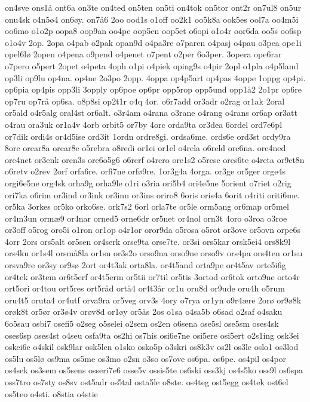 {on4sve
ons1å
ont6a
on3te
on4ted
on5ten
on5ti
on4tok
on5tor
ont2r
on7ul8
on5ur
onu4sk
o4n5ø4
on6øy.
on7å6
2oo
ood1s
o1off
oo2k1
oo5k8a
ook5es
ool7a
oo4m5i
oo6mo
o1o2p
oopa8
oop9an
oo4pe
oop5en
oop5et
o6opi
o1o4r
oor6da
oo5s
oo6sp
o1o4v
2op.
2opa
o4pab
o2pak
opan9d
o4pa3re
o7paren
o4pasj
o4pau
o3pea
ope1i
opel6lø
2open
o4pena
o9pend
o4penet
o7pent
o2per
6o3per.
3opera
ope6rar
o7pero
o5pert
2opet
o4peta
4oph
o1pi
o4piek
oping9s
o4pir
2opl
o1pla
o4p5land
op3li
op9lu
op4na.
op4ne
2o3po
2opp.
4oppa
op4p5art
op4pas
4oppe
1oppg
op4pi.
op6pia
op4pis
opp3li
3opply
op6poe
op6pr
opp5rop
opp5und
opp1å2
2o1pr
op6re
op7ru
op7rå
op6sa.
o8p8si
op2t1r
o4q
4or.
o6r7add
or3adr
o2rag
or1ak
2oral
or5ald
o4r5alg
oral4st
or6alt.
o3r4am
o4rana
o3rane
o4rang
o4rans
or6ap
or3att
o4rau
ora3uk
or1a4v
4orb
orbit5
or7by
4orc
orda9ta
or3dea
6ordel
ord7e6pl
or7dik
ordi4s
or4d5ise
ord3it
1ordn
ordre8gi.
ordsa6me.
ords6e
ord3st
ordy9ra
8ore
orear8a
orear8e
o5rebra
o8redi
or1ei
or1el
o4rela
o6reld
ore6na.
ore4ned
ore4net
or3enk
oren3s
ore6o5g6
o6rerf
o4rero
ore1s2
o5resc
ores6te
o4reta
or9et8n
o6retv
o2rev
2orf
orfa6re.
orfi7ne
orfø9re.
1or3g4a
4orga.
or3ge
or5ger
orge4s
orgi6e5ne
org4sk
orha9g
orha9le
o1ri
o3ria
ori5b4
ori4e5ne
5orient
o7riet
o2rig
ori7ka
o6rim
or3ind
or3ink
or3inn
or3ins
oriro8
6oris
oris4a
6orit
o4riti
oriti6me.
or5ka
3orkes
or5ko
orko6se.
ork7s2
6orl
orla7te
or5le
orm5ang
or6map
or5mel
or4m3un
ormæ9
or4nar
orned5
orne6dr
or5net
or4nol
orn3t
4oro
o3roa
o3roe
or3off
o5rog
oro5i
o1ron
or1op
o4r1or
oror9da
o5rosa
o5rot
or3ove
or5ovn
orpe6s
4orr
2ors
ors5alt
or5sen
or4serk
orse9ta
orse7te.
or3si
ors5kar
orsk5ei4
ors8k9l
ors4ku
or1s4l
orsmå8la
or1sn
or3s2o
orso9na
orso9ne
orso9v
ors4pa
ors4ten
or1su
orsva9re
or3sy
or9sø
2ort
or4t3ak
orta8la.
or4t5and
orta9pe
or4t5av
orte5i6g
or4tek
or3tem
or6t5erf
or4t5erm
or5tii
or7til
or5tis
3ortod
or6tok
orto9ne
orto4r
ort5ori
or4tou
ort5res
ort5råd
ortå4
or4t3år
or1u
oru8d
or9ude
oru4h
o5rum
oru4t5
oruta4
or4utf
orva9ra
or5veg
orv3s
4ory
o7rya
or1yn
o9r4ære
2orø
or9ø8k
orøk8t
or5ør
or3ø4v
orøv8d
or1øy
or5ås
2os
o1sa
o4sa5b
o6sad
o2saf
o4saku
6o5sau
osbi7
osefi5
o2seg
o5selei
o2sem
os2en
o6sena
ose5sl
ose5sm
oses4sk
oses6sp
oses4st
o4seu
osfa9ta
os2hi
os7his
osi6e7ne
osi5ere
osi5ert
o2s1ing
osk3ei
oskei6e
o4skil
osk9lar
osk5len
o1sko
osko5p
o3skri
os8k3v
os2l
os3le
oslo1
os3lod
os5lu
os5lø
os9ma
os5me
os3mo
o2sn
o3so
os7ove
os6pa.
os6pe.
os4pil
os4por
os4sek
os3sem
os5sens
osseri7e6
osse5v
ossis5te
os6ski
oss3kj
os4s5ko
oss9l
os6spa
oss7tro
os7sty
os8sv
ost5adr
os5tal
osta5le
o8ste.
os4teg
ost5egg
os4tek
ost6el
os5teo
o4sti.
o8stia
o4stie
}
